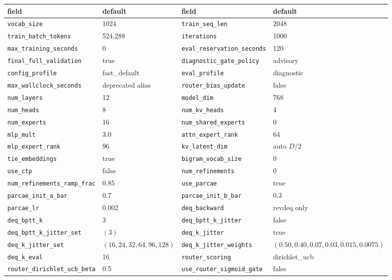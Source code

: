 \documentclass[11pt]{article}
\begin{document}
\begin{center}\small
\begin{tabular}{ll|ll}
\toprule
\textbf{field} & \textbf{default} & \textbf{field} & \textbf{default} \\
\midrule
\texttt{vocab\_size} & 1024 & \texttt{train\_seq\_len} & 2048 \\
\texttt{train\_batch\_tokens} & 524,288 & \texttt{iterations} & 1000 \\
\texttt{max\_training\_seconds} & 0 & \texttt{eval\_reservation\_seconds} & 120 \\
\texttt{final\_full\_validation} & true & \texttt{diagnostic\_gate\_policy} & advisory \\
\texttt{config\_profile} & fast\_default & \texttt{eval\_profile} & diagnostic \\
\texttt{max\_wallclock\_seconds} & deprecated alias & \texttt{router\_bias\_update} & false \\
\texttt{num\_layers} & 12 & \texttt{model\_dim} & 768 \\
\texttt{num\_heads} & 8 & \texttt{num\_kv\_heads} & 4 \\
\texttt{num\_experts} & 16 & \texttt{num\_shared\_experts} & 0 \\
\texttt{mlp\_mult} & 3.0 & \texttt{attn\_expert\_rank} & 64 \\
\texttt{mlp\_expert\_rank} & 96 & \texttt{kv\_latent\_dim} & auto $D/2$ \\
\texttt{tie\_embeddings} & true & \texttt{bigram\_vocab\_size} & 0 \\
\texttt{use\_ctp} & false & \texttt{num\_refinements} & 0 \\
\texttt{num\_refinements\_ramp\_frac} & 0.85 & \texttt{use\_parcae} & true \\
\texttt{parcae\_init\_a\_bar} & 0.7 & \texttt{parcae\_init\_b\_bar} & 0.3 \\
\texttt{parcae\_lr} & 0.002 & \texttt{deq\_backward} & revdeq only \\
\texttt{deq\_bptt\_k} & 3 & \texttt{deq\_bptt\_k\_jitter} & false \\
\texttt{deq\_bptt\_k\_jitter\_set} & $(3)$ & \texttt{deq\_k\_jitter} & true \\
\texttt{deq\_k\_jitter\_set} & $(16,24,32,64,96,128)$ & \texttt{deq\_k\_jitter\_weights} & $(0.50,0.40,0.07,0.03,0.015,0.0075)$ \\
\texttt{deq\_k\_eval} & 16 & \texttt{router\_scoring} & dirichlet\_ucb \\
\texttt{router\_dirichlet\_ucb\_beta} & 0.5 & \texttt{use\_router\_sigmoid\_gate} & false \\

\end{tabular}
\end{center}
\end{document}
